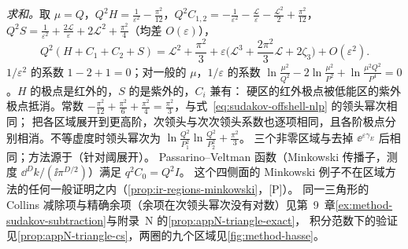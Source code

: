 \begin{example}
\emph{求和。}取 $\mu=Q$，$Q^2H=\frac1{\varepsilon^2}-\frac{\pi^2}{12}$，$Q^2C_{1,2}=-\frac1{\varepsilon^2}-\frac{\mathcal L}\varepsilon-\frac{\mathcal L^2}2+\frac{\pi^2}{12}$，
$Q^2S=\frac1{\varepsilon^2}+\frac{2\mathcal L}\varepsilon+2\mathcal L^2+\frac{\pi^2}4$（均差 $O(\varepsilon)$），
\begin{equation}\label{eq:sudakov-regions-sum}
Q^2(H+C_1+C_2+S)=\mathcal L^2+\frac{\pi^2}3+\varepsilon\Big(\mathcal L^3+\frac{2\pi^2}3\mathcal L+2\zeta_3\Big)+O(\varepsilon^2).
\end{equation}
$1/\varepsilon^2$ 的系数 $1-2+1=0$；对一般的 $\mu$，$1/\varepsilon$ 的系数 $\ln\frac{\mu^2}{Q^2}-2\ln\frac{\mu^2}{P^2}+\ln\frac{\mu^2Q^2}{P^4}=0$。$H$ 的极点是红外的，$S$ 的是紫外的，$C_i$ 兼有：
硬区的红外极点被低能区的紫外极点抵消。常数 $-\frac{\pi^2}{12}+\frac{\pi^2}6+\frac{\pi^2}4=\frac{\pi^2}3$，与式~\eqref{eq:sudakov-offshell-nlp} 的领头幂次相同；
把各区域展开到更高阶，次领头与次次领头系数也逐项相同，且各阶极点分别相消。不等虚度时领头幂次为 $\ln\frac{Q^2}{P_1^2}\ln\frac{Q^2}{P_2^2}+\frac{\pi^2}3$。%
三个非零区域与\cite[第~2.2~节，式~(2.39)--(2.44)]{BecherBroggioFerroglia2015}去掉 $\ee^{\varepsilon\gamma_E}$ 后相同；方法源于\cite{BenekeSmirnov1998}（针对阈展开）。
Passarino--Veltman 函数（Minkowski 传播子，测度 $\dd^Dk/(\ii\pi^{D/2})$）满足 $q^2C_0=Q^2I$。%
这个四侧面的 Minkowski 例子不在区域方法的任何一般证明之内（\cref{prop:ir-regions-minkowski}，[P]）。
同一三角形的 Collins 减除项与精确余项（余项在次领头幂次没有对数）见第~9~章\cref{ex:method-sudakov-subtraction}与附录~N 的\cref{prop:appN-triangle-exact}，
积分范数下的验证见\cref{prop:appN-triangle-cs}，两圈的九个区域见\cref{fig:method-hasse}。
\end{example}



